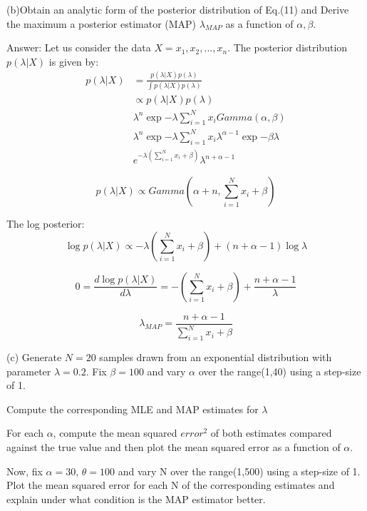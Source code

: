 \documentclass{article}
\begin{document}
(b)Obtain an analytic form of the posterior distribution of Eq.(11) and Derive the maximum a posterior estimator (MAP) $\lambda_{MAP}$ as a function of $\alpha,\beta$.

Answer:
Let us consider the data $X = x_{1},x_{2},...,x_{n}$. The posterior distribution $p(\lambda | X)$ is given by:
\begin{equation}
\begin{aligned}
p(\lambda | X) &= \frac{p(\lambda | X) p(\lambda)}{\int p(\lambda | X) p(\lambda)} \\
& \propto p(\lambda | X) p(\lambda) \\
& \lambda^{n} \exp{-\lambda \sum_{i=1}^{N} x_{i}} Gamma(\alpha,\beta) \\
& \lambda^{n} \exp{-\lambda \sum_{i=1}^{N} x_{i}} \lambda^{\alpha-1}\exp{-\beta \lambda} \\
& e^{-\lambda(\sum_{i=1}^{N} x_{i}+\beta)} \lambda^{n+\alpha-1}
\end{aligned}
\end{equation}

\begin{equation}
p(\lambda | X) \propto Gamma(\alpha+n,\sum_{i=1}^{N} x_{i}+\beta )  
\end{equation}

The log posterior:
\begin{equation}
\log p(\lambda | X) \propto -\lambda(\sum_{i=1}^{N} x_{i}+\beta)+(n+\alpha-1)\log \lambda
\end{equation}

\begin{equation}
0 = \frac{d \log p(\lambda | X) }{d \lambda} = -(\sum_{i=1}^{N} x_{i}+\beta)+ \frac{n+\alpha-1}{\lambda}
\end{equation}

\begin{equation}
\lambda_{MAP}= \frac{n+\alpha-1}{\sum_{i=1}^{N} x_{i}+\beta}
\end{equation}

(c) Generate $N=20$ samples drawn from an exponential distribution with parameter $\lambda = 0.2$. Fix $\beta = 100$ and vary $\alpha$ over the range(1,40) using a step-size of 1.

Compute the corresponding MLE and MAP estimates for $\lambda$

For each $\alpha$, compute the mean squared $error^2$ of both estimates compared against the true value and then plot the mean squared error as a function of $\alpha$.

Now, fix $\alpha= 30$, $\theta=100$ and vary N over the range(1,500) using a step-size of 1. Plot the mean squared error for each N of the corresponding estimates and explain under what condition is the MAP estimator better.
\end{document}
